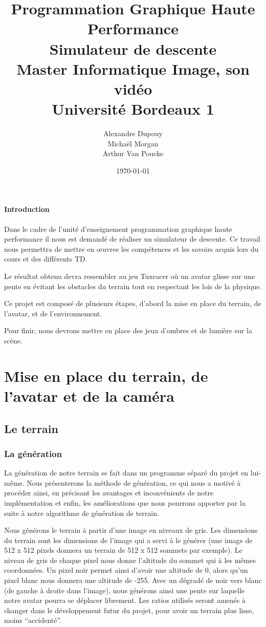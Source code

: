 \documentclass{report}
\title{Programmation Graphique Haute Performance\\Simulateur de descente\\Master Informatique Image, son vidéo\\Université Bordeaux 1}
\author{Alexandre Dupouy\\Michaël Morgan\\Arthur Van Poucke}
\date{\today}
\begin{document}
 
\maketitle

\newpage

\tableofcontents

\newpage

\subsubsection*{Introduction}

Dans le cadre de l'unité d'enseignement programmation graphique haute performance il nous est demandé de réaliser un simulateur de descente. Ce travail nous permettra de mettre en œuvres les compétences et les savoirs acquis lors du cours et des différents TD.


Le résultat obtenu devra ressembler au jeu Tuxracer où un avatar glisse sur une pente en évitant les obstacles du terrain tout en respectant les lois de la physique.


Ce projet est composé de plusieurs étapes, d'abord la mise en place du terrain, de l'avatar, et de l'environnement.


Pour finir, nous devrons mettre en place des jeux d'ombres et de lumière sur la scène. 

\chapter{Mise en place du terrain, de l'avatar et de la caméra}

\section{Le terrain}

\subsection*{La génération}
La génération de notre terrain se fait dans un programme séparé du projet en lui-même. Nous présenterons la méthode de génération, ce qui nous a motivé à procéder ainsi, en précisant les avantages et inconvénients de notre implémentation et enfin, les améliorations que nous pourrons apporter par la suite à notre algorithme de génération de terrain.

Nous générons le terrain à partir d’une image en niveaux de gris. Les dimensions du terrain sont les dimensions de l’image qui a servi à le générer (une image de 512 x 512 pixels donnera un terrain de 512 x 512 sommets par exemple). Le niveau de gris de chaque pixel nous donne l’altitude du sommet qui à les mêmes coordonnées. Un pixel noir permet ainsi d’avoir une altitude de 0, alors qu’un pixel blanc nous donnera une altitude de -255. Avec un dégradé de noir vers blanc (de gauche à droite dans l’image), nous générons ainsi une pente sur laquelle notre avatar pourra se déplacer librement. Les ratios utilisés seront amenés à changer dans le développement futur du projet, pour avoir un terrain plus lisse, moins “accidenté”.
\end{document}
